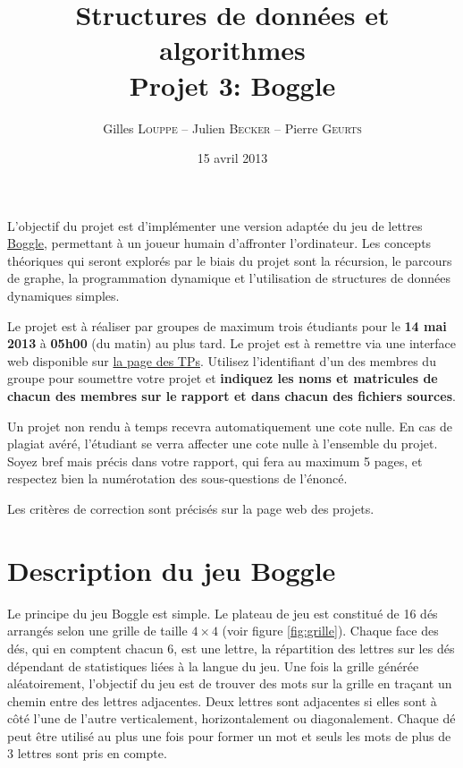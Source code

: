 \documentclass[a4paper,10pt]{article}
\title{
    \textbf{Structures de données et algorithmes}\\
    Projet 3: Boggle
}
\author{Gilles \textsc{Louppe} -- Julien \textsc{Becker} -- Pierre \textsc{Geurts}}
\date{15 avril 2013}
\begin{document}
\maketitle

L'objectif du projet est d'implémenter une version adaptée du jeu de
lettres \href{http://fr.wikipedia.org/wiki/Boggle}{Boggle}, permettant à un
joueur humain d'affronter l'ordinateur. Les concepts théoriques qui
seront explorés par le biais du projet sont la récursion, le parcours
de graphe, la programmation dynamique et l'utilisation de structures de
données dynamiques simples.

Le projet est à réaliser par groupes de maximum trois étudiants pour
le {\bf 14 mai 2013} à {\bf 05h00} (du matin) au plus tard. Le projet
est à remettre via une interface web disponible sur
\href{http://www.montefiore.ulg.ac.be/~glouppe/2012-2013/students.info0902.php}{la
  page des TPs}. Utilisez l'identifiant d'un des membres du groupe
  pour soumettre votre projet et \textbf{indiquez les noms et matricules de chacun des membres
  sur le rapport et dans chacun des fichiers sources}.

Un projet non rendu à temps recevra automatiquement une cote nulle. En
cas de plagiat avéré, l'étudiant se verra affecter une cote nulle à
l'ensemble du projet. Soyez bref mais précis dans votre rapport, qui
fera au maximum 5 pages, et respectez bien la numérotation des
sous-questions de l'énoncé.

Les critères de correction sont précisés sur la page web des projets.

\section{Description du jeu Boggle}

Le principe du jeu Boggle est simple. Le plateau de jeu est constitué
de 16 dés arrangés selon une grille de taille $4\times 4$ (voir figure
\ref{fig:grille}). Chaque face des dés, qui en comptent chacun 6, est
une lettre, la répartition des lettres sur les dés dépendant de
statistiques liées à la langue du jeu. Une fois la grille générée
aléatoirement, l'objectif du jeu est de trouver des mots sur la grille
en traçant un chemin entre des lettres adjacentes. Deux lettres sont
adjacentes si elles sont à côté l'une de l'autre verticalement,
horizontalement ou diagonalement. Chaque dé peut être utilisé au plus
une fois pour former un mot et seuls les mots de plus de 3 lettres
sont pris en compte.
\end{document}
